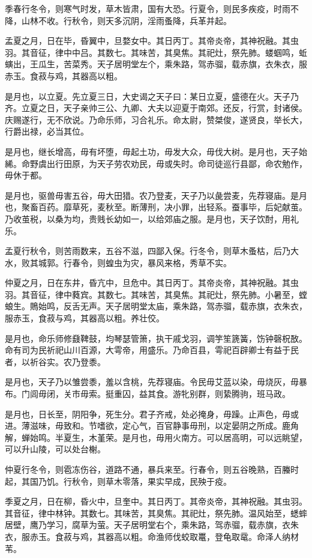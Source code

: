 \documentclass[]{article}
\begin{document}
季春行冬令，则寒气时发，草木皆肃，国有大恐。行夏令，则民多疾疫，时雨不降，山林不收。行秋令，则天多沉阴，淫雨蚤降，兵革并起。

孟夏之月，日在毕，昏翼中，旦婺女中。其日丙丁。其帝炎帝，其神祝融。其虫羽。其音征，律中中吕。其数七。其味苦，其臭焦。其祀灶，祭先肺。蝼蝈鸣，蚯螾出，王瓜生，苦菜秀。天子居明堂左个，乘朱路，驾赤骝，载赤旗，衣朱衣，服赤玉。食菽与鸡，其器高以粗。

是月也，以立夏。先立夏三日，大史谒之天子曰：某日立夏，盛德在火。天子乃齐。立夏之日，天子亲帅三公、九卿、大夫以迎夏于南郊。还反，行赏，封诸侯。庆赐遂行，无不欣说。乃命乐师，习合礼乐。命太尉，赞桀俊，遂贤良，举长大，行爵出禄，必当其位。

是月也，继长增高，毋有坏堕，毋起土功，毋发大众，毋伐大树。是月也，天子始絺。命野虞出行田原，为天子劳农劝民，毋或失时。命司徒巡行县鄙，命农勉作，毋休于都。

是月也，驱兽毋害五谷，毋大田猎。农乃登麦，天子乃以彘尝麦，先荐寝庙。是月也，聚畜百药。靡草死，麦秋至。断薄刑，决小罪，出轻系。蚕事毕，后妃献茧。乃收茧税，以桑为均，贵贱长幼如一，以给郊庙之服。是月也，天子饮酎，用礼乐。

孟夏行秋令，则苦雨数来，五谷不滋，四鄙入保。行冬令，则草木蚤枯，后乃大水，败其城郭。行春令，则蝗虫为灾，暴风来格，秀草不实。

仲夏之月，日在东井，昏亢中，旦危中。其日丙丁。其帝炎帝，其神祝融。其虫羽。其音征，律中蕤宾。其数七。其味苦，其臭焦。其祀灶，祭先肺。小暑至，螳蜋生。鵙始鸣，反舌无声。天子居明堂太庙，乘朱路，驾赤骝，载赤旗，衣朱衣，服赤玉，食菽与鸡，其器高以粗。养壮佼。

是月也，命乐师修鼗鞞鼓，均琴瑟管箫，执干戚戈羽，调竽笙篪簧，饬钟磬柷敔。命有司为民祈祀山川百源，大雩帝，用盛乐。乃命百县，雩祀百辟卿士有益于民者，以祈谷实。农乃登黍。

是月也，天子乃以雏尝黍，羞以含桃，先荐寝庙。令民毋艾蓝以染，毋烧灰，毋暴布。门闾毋闭，关市毋索。挺重囚，益其食。游牝别群，则絷腾驹，班马政。

是月也，日长至，阴阳争，死生分。君子齐戒，处必掩身，毋躁。止声色，毋或进。薄滋味，毋致和。节嗜欲，定心气，百官静事毋刑，以定晏阴之所成。鹿角解，蝉始鸣。半夏生，木堇荣。是月也，毋用火南方。可以居高明，可以远眺望，可以升山陵，可以处台榭。

仲夏行冬令，则雹冻伤谷，道路不通，暴兵来至。行春令，则五谷晚熟，百螣时起，其国乃饥。行秋令，则草木零落，果实早成，民殃于疫。

季夏之月，日在柳，昏火中，旦奎中。其日丙丁。其帝炎帝，其神祝融。其虫羽。其音征，律中林钟。其数七。其味苦，其臭焦。其祀灶，祭先肺。温风始至，蟋蟀居壁，鹰乃学习，腐草为萤。天子居明堂右个，乘朱路，驾赤骝，载赤旗，衣朱衣，服赤玉。食菽与鸡，其器高以粗。命渔师伐蛟取鼍，登龟取鼋。命泽人纳材苇。
\end{document}

